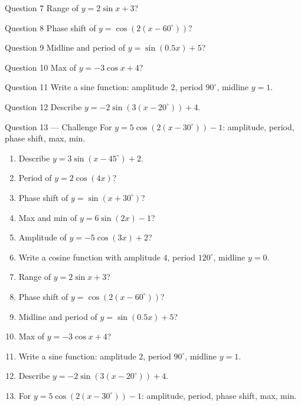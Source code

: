 \documentclass[11pt]{article}
\begin{document}
\begin{qbox}{Question 7}
Range of $y=2\sin x+3$?\workspace{2.4cm}
\end{qbox}

\begin{qbox}{Question 8}
Phase shift of $y=\cos(2(x-60^\circ))$?\workspace{2.4cm}
\end{qbox}

\begin{qbox}{Question 9}
Midline and period of $y=\sin(0.5x)+5$?\workspace{2.4cm}
\end{qbox}

\begin{qbox}{Question 10}
Max of $y=-3\cos x+4$?\workspace{2.4cm}
\end{qbox}

\begin{qbox}{Question 11}
Write a sine function: amplitude $2$, period $90^\circ$, midline $y=1$.\workspace{2.4cm}
\end{qbox}

\begin{qbox}{Question 12}
Describe $y=-2\sin(3(x-20^\circ))+4$.\workspace{2.4cm}
\end{qbox}

\begin{qbox}{Question 13 --- Challenge}
For $y=5\cos(2(x-30^\circ))-1$: amplitude, period, phase shift, max, min.\workspace{3.2cm}
\end{qbox}

\clearpage
{}

\begin{recapbox}
\begin{multicols}{2}
\small
\begin{enumerate}[leftmargin=*,itemsep=3pt]
  \item Describe $y=3\sin(x-45^\circ)+2$.
  \item Period of $y=2\cos(4x)$?
  \item Phase shift of $y=\sin(x+30^\circ)$?
  \item Max and min of $y=6\sin(2x)-1$?
  \item Amplitude of $y=-5\cos(3x)+2$?
  \item Write a cosine function with amplitude $4$, period $120^\circ$, midline $y=0$.
  \item Range of $y=2\sin x+3$?
  \item Phase shift of $y=\cos(2(x-60^\circ))$?
  \item Midline and period of $y=\sin(0.5x)+5$?
  \item Max of $y=-3\cos x+4$?
  \item Write a sine function: amplitude $2$, period $90^\circ$, midline $y=1$.
  \item Describe $y=-2\sin(3(x-20^\circ))+4$.
  \item For $y=5\cos(2(x-30^\circ))-1$: amplitude, period, phase shift, max, min.
\end{enumerate}
\end{multicols}
\end{recapbox}
\end{document}
